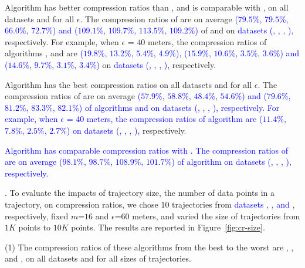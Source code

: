  Algorithm \cist has better compression ratios than \squishe, and is {comparable} with \dps, on all datasets and for all $\epsilon$.
The compression ratios of \cist are on average \textcolor{blue}{($79.5\%$, $79.5\%$, $66.0\%$,
$72.7\%$)  and ($109.1\%$, $109.7\%$, $113.5\%$, $109.2\%$)} of \squishe and
\dps on \textcolor{blue}{datasets (\sercar, \geolife, \mopsi, \pricar)}, respectively.
For example, when $\epsilon$ = $40$ meters, the compression ratios of algorithms
\squishe, \cist and \dps are \textcolor{blue}{($19.8\%$, $13.2\%$, $5.4\%$, $4.9\%$), ($15.9\%$,
$10.6\%$, $3.5\%$, $3.6\%$) and ($14.6\%$, $9.7\%$, $3.1\%$, $3.4\%$)} on  \textcolor{blue}{datasets (\sercar, \geolife, \mopsi, \pricar)}, respectively.

 Algorithm \cista has {the best} compression ratios on all datasets and for all $\epsilon$.
The compression ratios of \cista are on average \textcolor{blue}{($57.9\%$, $58.8\%$, $48.4\%$,
$54.6\%$) and ($79.6\%$, $81.2\%$, $83.3\%$, $82.1\%$) of algorithms
\squishe and \dps  on \textcolor{blue}{datasets (\sercar, \geolife, \mopsi, \pricar)}, respectively.
For example, when $\epsilon$ = $40$ meters, the compression ratios of algorithm
\cista are ($11.4\%$, $7.8\%$, $2.5\%$, $2.7\%$) on datasets (\mopsi, \sercar, \geolife, \pricar)}, respectively.

\textcolor{blue}{
 Algorithm \cista has {comparable} compression ratios with \cisto.
The compression ratios of \cista are on average ($98.1\%$, $98.7\%$, $108.9\%$, $101.7\%$)  
of algorithm \cisto on datasets (\sercar, \geolife, \mopsi, \pricar), respectively.
}

.
To evaluate the impacts of trajectory size, \ie the number of data points in a trajectory, on compression ratios,
we chose {$10$} trajectories from \textcolor{blue}{datasets \sercar, \geolife, \mopsi and \pricar}, respectively,
fixed {$m$=$16$} and $\epsilon$=$60$ meters, and varied the size  of trajectories from $1K$ points to $10K$ points.
%
The results are reported in Figure~\ref{fig:cr-size}.

\ni(1) The compression ratios of these algorithms from the best to the worst are \cista, \dps, \cist and \squishe, on all datasets and for all sizes of trajectories. %

